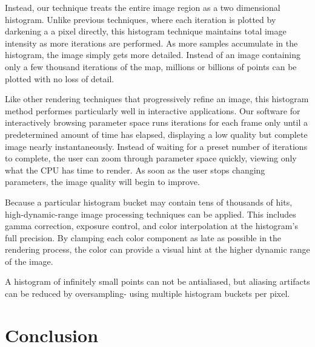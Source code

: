\documentclass{acmsiggraph}
\begin{document}
Instead, our technique treats the entire image region as a two dimensional
histogram. Unlike previous techniques, where each iteration is plotted by
darkening a a pixel directly, this histogram technique maintains total image
intensity as more iterations are performed. As more samples accumulate in the
histogram, the image simply gets more detailed. Instead of an image containing
only a few thousand iterations of the map, millions or billions of points can
be plotted with no loss of detail.

Like other rendering techniques that progressively refine an image, this
histogram method performes particularly well in interactive applications.
Our software for interactively browsing parameter space runs iterations
for each frame only until a predetermined amount of time has elapsed,
displaying a low quality but complete image nearly instantaneously.
Instead of waiting for a preset number of iterations to complete, the user
can zoom through parameter space quickly, viewing only what the CPU has time
to render. As soon as the user stops changing parameters, the image quality
will begin to improve.

Because a particular histogram bucket may contain tens of thousands of hits,
high-dynamic-range image processing techniques can be applied. This includes
gamma correction, exposure control, and color interpolation at the histogram's
full precision. By clamping each color component as late as possible in the
rendering process, the color can provide a visual hint at the higher
dynamic range of the image.

A histogram of infinitely small points can not be antialiased, but aliasing
artifacts can be reduced by oversampling- using multiple histogram buckets
per pixel.


\section{Conclusion}
\end{document}
